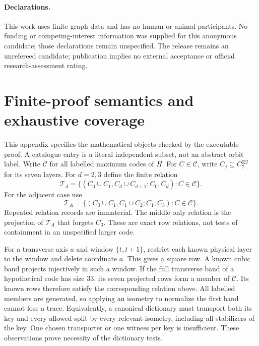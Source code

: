 \documentclass[11pt]{article}
\theoremstyle{definition}
\newcommand{\G}[1]{C_7^{\boxtimes #1}}
\begin{document}
\paragraph{Declarations.}
This work uses finite graph data and has no human or animal participants.
No funding or competing-interest information was supplied for this anonymous
candidate; those declarations remain unspecified. The release remains an unrefereed candidate; publication implies no
external acceptance or official research-assessment rating.

\appendix
\section{Finite-proof semantics and exhaustive coverage}\label{app:finite}
This appendix specifies the mathematical objects checked by the executable
proof. A catalogue entry is a literal independent subset, not an abstract
orbit label. Write $\mathcal C$ for all labelled maximum codes of $H$.
For $C\in\mathcal C$, write $C_j\subseteq\G2$ for its seven layers.
For $d=2,3$ define the finite relation
\[
 \mathcal T_d=\{(C_0\cup C_1,C_d\cup C_{d+1};C_0,C_d):C\in\mathcal C\}.
\]
For the adjacent case use
\[
 \mathcal T_A=\{(C_0\cup C_1,C_1\cup C_2;C_1,C_3):C\in\mathcal C\}.
\]
Repeated relation records are immaterial. The middle-only relation is the
projection of $\mathcal T_A$ that forgets $C_3$. These are exact row
relations, not tests of containment in an unspecified larger code.

For a transverse axis $a$ and window $\{t,t+1\}$, restrict each known
physical layer to the window and delete coordinate $a$. This gives a
square row. A known cubic band projects injectively in such a window.
If the full transverse band of a hypothetical code has size 33, its
seven projected rows form a member of $\mathcal C$. Its known rows
therefore satisfy the corresponding relation above. All labelled members
are generated, so applying an isometry to normalize the first band
cannot lose a trace. Equivalently, a canonical dictionary must transport
both its key and every allowed split by every relevant isometry, including
all stabilizers of the key. One chosen transporter or one witness per key
is insufficient. These observations prove necessity of the dictionary tests.
\end{document}

